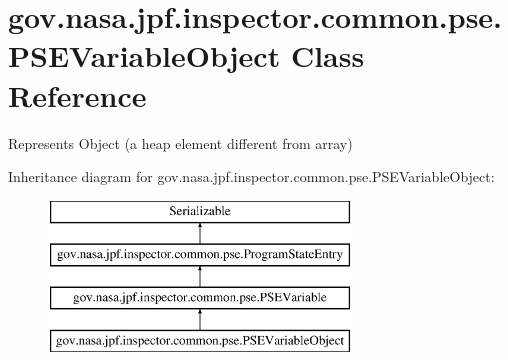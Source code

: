 \hypertarget{classgov_1_1nasa_1_1jpf_1_1inspector_1_1common_1_1pse_1_1_p_s_e_variable_object}{}\section{gov.\+nasa.\+jpf.\+inspector.\+common.\+pse.\+P\+S\+E\+Variable\+Object Class Reference}
\label{classgov_1_1nasa_1_1jpf_1_1inspector_1_1common_1_1pse_1_1_p_s_e_variable_object}


Represents Object (a heap element different from array)  


Inheritance diagram for gov.\+nasa.\+jpf.\+inspector.\+common.\+pse.\+P\+S\+E\+Variable\+Object\+:\begin{figure}[H]
\begin{center}
\leavevmode
\includegraphics[height=4.000000cm]{classgov_1_1nasa_1_1jpf_1_1inspector_1_1common_1_1pse_1_1_p_s_e_variable_object}
\end{center}
\end{figure}
